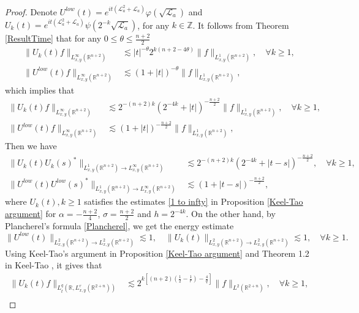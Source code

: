 \documentclass[a4paper,11pt, reqno]{amsart}
\numberwithin{equation}{section}
\theoremstyle{plain}
\theoremstyle{definition}
\theoremstyle{remark}
\begin{document}
\begin{proof} Denote $U^{low}(t)=e^{it(\mathcal{L}_a^2+\mathcal{L}_a)}\varphi(\sqrt{\mathcal{L}_a})$ and $U_k(t)=e^{it(\mathcal{L}_a^2+\mathcal{L}_a)}\psi(2^{-k}\sqrt{\mathcal{L}_a})$, for any $k\in\mathbb{Z}$.
It follows from Theorem \ref{ResultTime} that for any $0\leq \theta\leq \frac{n+2}{2}$
\begin{align*}
\|U_k(t)f\|_{L^\infty_{x,y}(\mathbb{R}^{n+2})}&\lesssim |t|^{-\theta}2^{k(n+2-4\theta)}\|f\|_{L^1_{x,y}(\mathbb{R}^{n+2})},\quad  \forall k\geq1,\\
\|U^{low}(t)f\|_{L^\infty_{x,y}(\mathbb{R}^{n+2})}&\lesssim (1+|t|)^{-\theta}\|f\|_{L^1_{x,y}(\mathbb{R}^{n+2})},
\end{align*}
which implies that
\begin{align*}
\|U_k(t)f\|_{L^\infty_{x,y}(\mathbb{R}^{n+2})}&\lesssim 2^{-(n+2)k}(2^{-4k}+|t|)^{-\frac{n+2}{2}}\|f\|_{L^1_{x,y}(\mathbb{R}^{n+2})},\quad \forall k\geq1,\\
\|U^{low}(t)f\|_{L^\infty_{x,y}(\mathbb{R}^{n+2})}&\lesssim (1+|t|)^{-\frac{n+2}{2}}\|f\|_{L^1_{x,y}(\mathbb{R}^{n+2})},
\end{align*}
Then we have
\begin{align*}
\|U_k(t)U_k(s)^*\|_{L^1_{x,y}(\mathbb{R}^{n+2})\rightarrow L^\infty_{x,y}(\mathbb{R}^{n+2})}&\lesssim 2^{-(n+2)k}(2^{-4k}+|t-s|)^{-\frac{n+2}{2}},\quad \forall k\geq1,\\
\|U^{low}(t)U^{low}(s)^*\|_{L^1_{x,y}(\mathbb{R}^{n+2})\rightarrow L^\infty_{x,y}(\mathbb{R}^{n+2})}&\lesssim (1+|t-s|)^{-\frac{n+2}{2}},
\end{align*}
where $U_k(t),k\geq1$ satisfies the estimates \eqref{1 to infty} in Proposition \ref{Keel-Tao argument} for $\alpha=-\frac{n+2}{4}$, $\sigma=\frac{n+2}{2}$ and $h=2^{-4k}$. 
On the other hand, by Plancherel's formula {\color{red} \eqref{Plancherel}}, we get the energy estimate
\begin{equation*}
\|U^{low}(t)\|_{L^2_{x,y}(\mathbb{R}^{n+2})\rightarrow L^2_{x,y}(\mathbb{R}^{n+2})}\lesssim 1,\quad \|U_k(t)\|_{L^2_{x,y}(\mathbb{R}^{n+2})\rightarrow L^2_{x,y}(\mathbb{R}^{n+2})}\lesssim 1,\quad \forall k\geq1.
\end{equation*}
Using Keel-Tao's argument in Proposition \ref{Keel-Tao argument} and Theorem 1.2 in Keel-Tao \cite{KT}, it gives that
\begin{align*}
\|U_k(t)f\|_{L_t^q(\mathbb{R},L^r_{x,y}(\mathbb{R}^{2+n}))}&\lesssim 2^{k[(n+2)(\frac{1}{2}-\frac{1}{r})-\frac{4}{q}]}\|f\|_{L^2(\mathbb{R}^{2+n})}, \quad\forall k\geq1,\\

\end{align*}
\end{proof}
\end{document}
